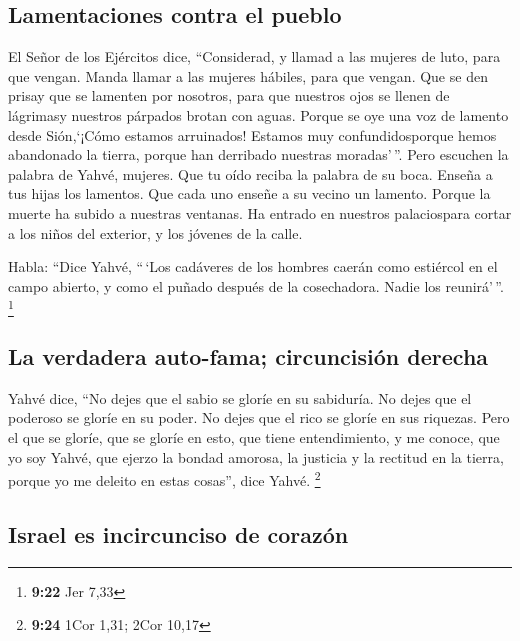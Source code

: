 \hypertarget{lamentaciones-contra-el-pueblo}{%
\subsection{Lamentaciones contra el
pueblo}\label{lamentaciones-contra-el-pueblo}}

 El Señor de los Ejércitos dice, ``Considerad, y llamad a
las mujeres de luto, para que vengan. Manda llamar a las mujeres
hábiles, para que vengan.  Que se den prisay que se
lamenten por nosotros, para que nuestros ojos se llenen de lágrimasy
nuestros párpados brotan con aguas.  Porque se oye una
voz de lamento desde Sión,`¡Cómo estamos arruinados! Estamos muy
confundidosporque hemos abandonado la tierra, porque han derribado
nuestras moradas'\,''.  Pero escuchen la palabra de
Yahvé, mujeres. Que tu oído reciba la palabra de su boca. Enseña a tus
hijas los lamentos. Que cada uno enseñe a su vecino un lamento.
 Porque la muerte ha subido a nuestras ventanas. Ha
entrado en nuestros palaciospara cortar a los niños del exterior, y los
jóvenes de la calle.

 Habla: ``Dice Yahvé, ``\,`Los cadáveres de los hombres
caerán como estiércol en el campo abierto, y como el puñado después de
la cosechadora. Nadie los reunirá'\,''. \footnote{\textbf{9:22} Jer 7,33}

\hypertarget{la-verdadera-auto-fama-circuncisiuxf3n-derecha}{%
\subsection{La verdadera auto-fama; circuncisión
derecha}\label{la-verdadera-auto-fama-circuncisiuxf3n-derecha}}

 Yahvé dice, ``No dejes que el sabio se gloríe en su
sabiduría. No dejes que el poderoso se gloríe en su poder. No dejes que
el rico se gloríe en sus riquezas.  Pero el que se
gloríe, que se gloríe en esto, que tiene entendimiento, y me conoce, que
yo soy Yahvé, que ejerzo la bondad amorosa, la justicia y la rectitud en
la tierra, porque yo me deleito en estas cosas'', dice Yahvé.
\footnote{\textbf{9:24} 1Cor 1,31; 2Cor 10,17}

\hypertarget{israel-es-incircunciso-de-corazuxf3n}{%
\subsection{Israel es incircunciso de
corazón}\label{israel-es-incircunciso-de-corazuxf3n}}

